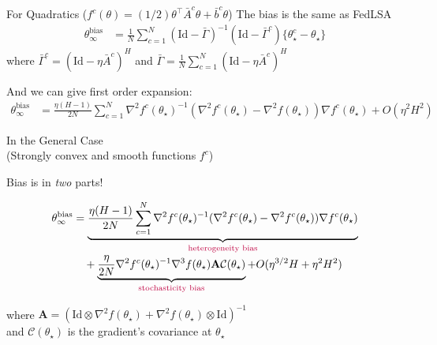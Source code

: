 \documentclass[aspectratio=169,14pt]{beamer}
\begin{document}
  \begin{frame}{\Large For Quadratics ($f^c(\theta) = (1/2)\theta^\top \bar{A}^c \theta + \bar{b}^c \theta$)}
    The bias is the same as FedLSA
    \begin{align*}
      \theta_\infty^{\text{bias}}
      & =
        \frac{1}{N}
        \sum_{c=1}^N
        (\text{Id} - \bar{\Gamma})^{-1} 
        (\text{Id} - \bar{\Gamma}^c)\{ \theta_\star^c - \theta_\star \}
    \end{align*}
    where $\bar{\Gamma}^c =(\text{Id}- \eta \bar{A}^c)^H$ and $\bar{\Gamma} = \tfrac{1}{N} \sum_{c=1}^N (\text{Id}- \eta \bar{A}^c)^H$

    \pause
    
    And we can give first order expansion:
    \begin{align*}
      \!\!\!\!\theta_\infty^{\text{bias}}
      & \!=\!
        \frac{\eta(H -1)}{2 N}
        \sum_{c=1}^N 
        \nabla^2 f^c(\theta_\star)^{-1} 
        (\nabla^2 f^c(\theta_\star) \!-\!  \nabla^2 f(\theta_\star)) \nabla f^c(\theta_\star)
        \!+\! O(\eta^2 H^2)
    \end{align*}
    
  \end{frame}

  \begin{frame}{In the General Case\\[-0.5em]
      \small (Strongly convex and smooth functions $f^c$)}

    \pause

    \vspace{-0.5em}
    
    Bias is in \emph{two} parts!

    \vspace{-2.5em}

    \begin{align*}
      \theta_\infty^{\text{bias}}
      & =
        \underbrace{
        \frac{\eta(H -1)}{2 N}
        \sum_{c=1}^N 
        \nabla^2 f^c(\theta_\star)^{-1} 
        (\nabla^2 f^c(\theta_\star) -  \nabla^2 f^c(\theta_\star)) \nabla f^c(\theta_\star)
        }_{\text{\textcolor{purple}{heterogeneity bias}}}
      \\[-0.2em]
      & \quad
        + \underbrace{
        \frac{\eta}{2 N} \nabla^2 f^c(\theta_\star)^{-1} \nabla^3 f(\theta_\star) \textbf{A} \mathcal{C}(\theta_\star)
        }_{\text{\textcolor{purple}{stochasticity bias}}}
        + O(\eta^{3/2} H + \eta^2 H^2)
    \end{align*}

    \vspace{-0.5em}

    where $\textbf{A} = (\text{Id} \otimes \nabla^2 f(\theta_\star) + \nabla^2 f(\theta_\star) \otimes \text{Id})^{-1}$\\
    and $\mathcal{C}(\theta_\star)$ is the gradient's covariance at $\theta_\star$
    
  \end{frame}
\end{document}
